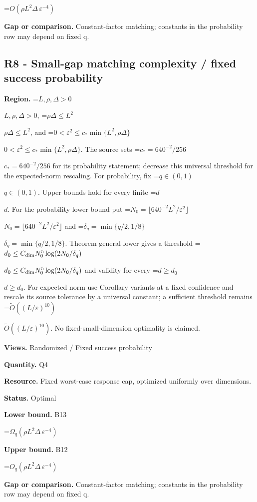 \documentclass[10pt,a4paper]{article}
\newcommand{\AtlasMath}[1]{\par\begingroup\centering\setbox0=\hbox{$\displaystyle #1$}\ifdim\wd0>1.4\linewidth\typeout{ATLAS WIDE FORMULA: \the\wd0}\fi\ifdim\wd0>\linewidth\resizebox{\linewidth}{!}{\box0}\else\box0\fi\par\endgroup}
\newcommand{\AtlasInlineMath}[1]{\begingroup\setbox0=\hbox{$#1$}\ifdim\wd0>.4\linewidth\endgroup\AtlasMath{#1}\else\endgroup$#1$\fi}
\begin{document}
\AtlasMath{O(\rho L^2\Delta\,\varepsilon^{-4})}


\textbf{Gap or comparison.} Constant-factor matching; constants in the probability row may depend on fixed q.



\subsection{R8 - Small-gap matching complexity / fixed success probability}


\textbf{Region.} \AtlasInlineMath{L,\rho,\Delta>0}, \AtlasInlineMath{\rho\Delta\le L^2}, and \AtlasInlineMath{0<\varepsilon^2\le c_*\min\{L^2,\rho\Delta\}}. The source sets \AtlasInlineMath{c_*=640^{-2}/256} for its probability statement; decrease this universal threshold for the expected-norm rescaling. For probability, fix \AtlasInlineMath{q\in(0,1)}. Upper bounds hold for every finite \AtlasInlineMath{d}. For the probability lower bound put \AtlasInlineMath{N_0=\lfloor640^{-2}L^2/\varepsilon^2\rfloor} and \AtlasInlineMath{\delta_q=\min\{q/2,1/8\}}. Theorem general-lower gives a threshold \AtlasInlineMath{d_0\le C_{\rm dim}N_0^5\log(2N_0/\delta_q)} and validity for every \AtlasInlineMath{d\ge d_0}. For expected norm use Corollary variants at a fixed confidence and rescale its source tolerance by a universal constant; a sufficient threshold remains \AtlasInlineMath{\widetilde O((L/\varepsilon)^{10})}. No fixed-small-dimension optimality is claimed.



\textbf{Views.} Randomized / Fixed success probability



\textbf{Quantity.} Q4



\textbf{Resource.} Fixed worst-case response cap, optimized uniformly over dimensions.



\textbf{Status.} Optimal



\textbf{Lower bound.} B13



\AtlasMath{\Omega_q(\rho L^2\Delta\,\varepsilon^{-4})}


\textbf{Upper bound.} B12



\AtlasMath{O_q(\rho L^2\Delta\,\varepsilon^{-4})}


\textbf{Gap or comparison.} Constant-factor matching; constants in the probability row may depend on fixed q.
\end{document}
